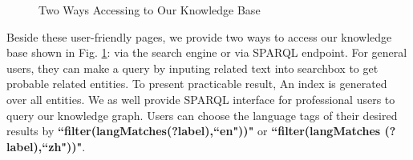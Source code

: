 \documentclass[runningheads,a4paper]{llncs}
\begin{document}
\begin{figure}
\centering
{}
\hspace{0.01cm}
\caption{Two Ways Accessing to Our Knowledge Base}
\label{fig:access}
\end{figure}

Beside these user-friendly pages, we provide two ways to access our knowledge base shown in Fig. \ref{fig:access}: via the search engine or via SPARQL endpoint. For general users, they can make a query by inputing related text into searchbox to get probable related entities. To present practicable result, An index is generated over all entities. We as well provide SPARQL interface for professional users to query our knowledge graph. Users can choose the language tags of their desired results by \textbf{``filter(langMatches(?label),``en"))"} or \textbf{``filter(langMatches (?label),``zh"))"}.%
\end{document}
